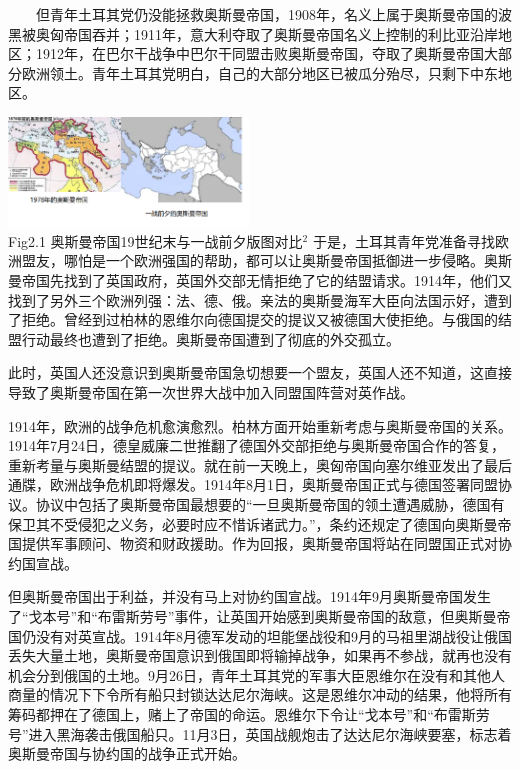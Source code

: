 \documentclass{article}
\begin{document}
\begin{flushleft}
    \justifying
    \ \ \ \ 但青年土耳其党仍没能拯救奥斯曼帝国，1908年，名义上属于奥斯曼帝国的波黑被奥匈帝国吞并；1911年，意大利夺取了奥斯曼帝国名义上控制的利比亚沿岸地区；1912年，在巴尔干战争中巴尔干同盟击败奥斯曼帝国，夺取了奥斯曼帝国大部分欧洲领土。青年土耳其党明白，自己的大部分地区已被瓜分殆尽，只剩下中东地区。
\end{flushleft}
\centering\includegraphics[width=6.4cm]{em.png}\\
\centering {} Fig2.1 奥斯曼帝国19世纪末与一战前夕版图对比$^2$\clearpage
{}
\justifying
\vspace{5pt}
于是，土耳其青年党准备寻找欧洲盟友，哪怕是一个欧洲强国的帮助，都可以让奥斯曼帝国抵御进一步侵略。奥斯曼帝国先找到了英国政府，英国外交部无情拒绝了它的结盟请求。1914年，他们又找到了另外三个欧洲列强：法、德、俄。亲法的奥斯曼海军大臣向法国示好，遭到了拒绝。曾经到过柏林的恩维尔向德国提交的提议又被德国大使拒绝。与俄国的结盟行动最终也遭到了拒绝。奥斯曼帝国遭到了彻底的外交孤立。

此时，英国人还没意识到奥斯曼帝国急切想要一个盟友，英国人还不知道，这直接导致了奥斯曼帝国在第一次世界大战中加入同盟国阵营对英作战。

1914年，欧洲的战争危机愈演愈烈。柏林方面开始重新考虑与奥斯曼帝国的关系。1914年7月24日，德皇威廉二世推翻了德国外交部拒绝与奥斯曼帝国合作的答复，重新考量与奥斯曼结盟的提议。就在前一天晚上，奥匈帝国向塞尔维亚发出了最后通牒，欧洲战争危机即将爆发。1914年8月1日，奥斯曼帝国正式与德国签署同盟协议。协议中包括了奥斯曼帝国最想要的“一旦奥斯曼帝国的领土遭遇威胁，德国有保卫其不受侵犯之义务，必要时应不惜诉诸武力。”，条约还规定了德国向奥斯曼帝国提供军事顾问、物资和财政援助。作为回报，奥斯曼帝国将站在同盟国正式对协约国宣战。

但奥斯曼帝国出于利益，并没有马上对协约国宣战。1914年9月奥斯曼帝国发生了“戈本号”和“布雷斯劳号”事件，让英国开始感到奥斯曼帝国的敌意，但奥斯曼帝国仍没有对英宣战。1914年8月德军发动的坦能堡战役和9月的马祖里湖战役让俄国丢失大量土地，奥斯曼帝国意识到俄国即将输掉战争，如果再不参战，就再也没有机会分到俄国的土地。9月26日，青年土耳其党的军事大臣恩维尔在没有和其他人商量的情况下下令所有船只封锁达达尼尔海峡。这是恩维尔冲动的结果，他将所有筹码都押在了德国上，赌上了帝国的命运。恩维尔下令让“戈本号”和“布雷斯劳号”进入黑海袭击俄国船只。11月3日，英国战舰炮击了达达尼尔海峡要塞，标志着奥斯曼帝国与协约国的战争正式开始。
\end{document}
